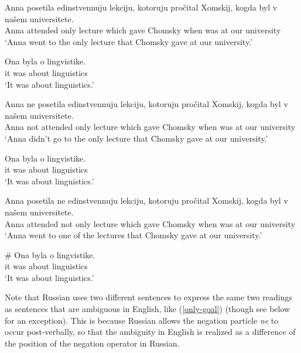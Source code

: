 \begin{exe}
	\ex \label{anna1} \begin{xlist}
		\ex \gll Anna posetila edinstvennuju lekciju, kotoruju pro\v{c}ital Xomskij, kogda byl v na\v{s}em universitete.\\
		Anna attended only lecture which gave Chomsky when was at our university\\
		\glt `Anna went to the only lecture that Chomsky gave at our university.'

		\ex \gll Ona byla o lingvistike.\\
		it was about linguistics\\
		\glt `It was about linguistics.'
	\end{xlist}

	\ex \label{anna2} \begin{xlist}
		\ex \gll Anna ne posetila edinstvennuju lekciju, kotoruju pro\v{c}ital Xomskij, kogda byl v na\v{s}em universitete.\\
		Anna not attended only lecture which gave Chomsky when was at our university\\
		\glt `Anna didn't go to the only lecture that Chomsky gave at our university.'

		\ex \gll Ona byla o lingvistike.\\
		it was about linguistics\\
		\glt `It was about linguistics.'
	\end{xlist}

	\ex \label{anna3} \begin{xlist}
		\ex \gll Anna posetila ne edinstvennuju lekciju, kotoruju pro\v{c}ital Xomskij, kogda byl v na\v{s}em universitete.\\
		Anna attended not only lecture which gave Chomsky when was at our university\\
		\glt `Anna went to one of the lectures that Chomsky gave at our university.'

		\ex \gll \# Ona byla o lingvistike.\\
		{} it was about linguistics\\
		\glt `It was about linguistics.'
	\end{xlist}
\end{exe}

Note that Russian uses two different sentences to express the same two readings as sentences that are ambiguous in English, like (\ref{only-goal}) (though see below for an exception). This is because Russian allows the negation particle \textit{ne} to occur post-verbally, so that the ambiguity in English is realized as a difference of the position of the negation operator in Russian.

